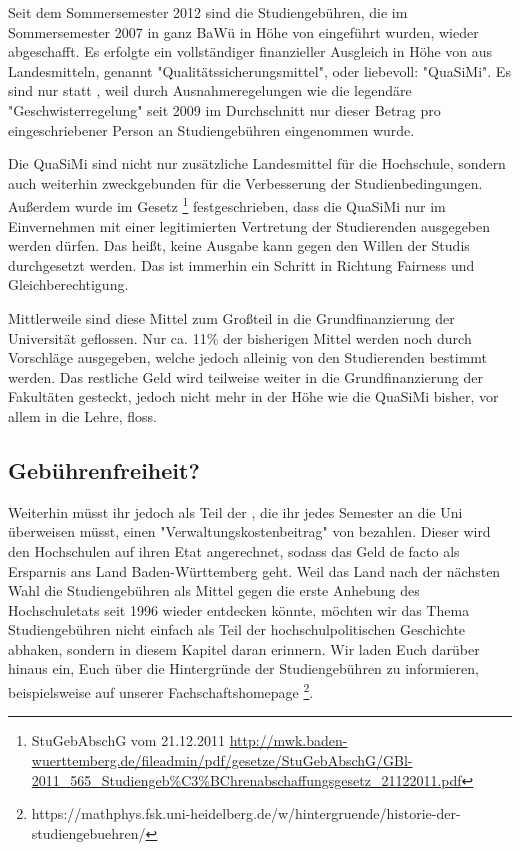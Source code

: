 %

\newpage
{}%
Seit dem Sommersemester 2012 sind die Studiengebühren, die im Sommersemester
2007 in ganz BaWü in Höhe von  eingeführt wurden, wieder abgeschafft.
Es erfolgte ein vollständiger finanzieller Ausgleich in Höhe von  aus
Landesmitteln, genannt "Qualitätssicherungsmittel", oder liebevoll: "QuaSiMi".
Es sind nur  statt , weil durch Ausnahmeregelungen wie die
legendäre "Geschwisterregelung" seit 2009 im Durchschnitt nur dieser Betrag pro
eingeschriebener Person an Studiengebühren eingenommen wurde.

Die QuaSiMi sind nicht nur zusätzliche Landesmittel für die Hochschule, sondern
auch weiterhin zweckgebunden für die Verbesserung der Studienbedingungen.
Außerdem wurde im Gesetz \footnote{StuGebAbschG vom 21.12.2011
\url{http://mwk.baden-wuerttemberg.de/fileadmin/pdf/gesetze/StuGebAbschG/GBl-2011_565_Studiengeb\%C3\%BChrenabschaffungsgesetz_21122011.pdf}}
festgeschrieben, dass die QuaSiMi nur im Einvernehmen mit einer legitimierten
Vertretung der Studierenden ausgegeben werden dürfen. Das heißt, keine Ausgabe
kann gegen den Willen der Studis durchgesetzt werden. Das ist immerhin ein
Schritt in Richtung Fairness und Gleichberechtigung.

Mittlerweile sind diese Mittel zum Großteil in die Grundfinanzierung der
Universität geflossen. Nur ca. 11\% der bisherigen Mittel werden noch durch
Vorschläge ausgegeben, welche jedoch alleinig von den Studierenden bestimmt
werden. Das restliche Geld wird teilweise weiter in die Grundfinanzierung der
Fakultäten gesteckt, jedoch nicht mehr in der Höhe wie die QuaSiMi bisher,
vor allem in die Lehre, floss.

\subsection*{Gebührenfreiheit?}
Weiterhin müsst ihr jedoch als Teil der \EUR{\beitragssumme}, die ihr jedes
Semester an die Uni überweisen müsst, einen "Verwaltungskostenbeitrag" von
\EUR{\verwaltungsbetrag} bezahlen. Dieser wird den Hochschulen auf ihren Etat
angerechnet, sodass das Geld de facto als Ersparnis ans Land Baden-Württemberg
geht. Weil das Land nach der nächsten Wahl die Studiengebühren als Mittel gegen
die erste Anhebung des Hochschuletats seit 1996 wieder entdecken könnte, möchten
wir das Thema Studiengebühren nicht einfach als Teil der hochschulpolitischen
Geschichte abhaken, sondern in diesem Kapitel daran erinnern.
Wir laden Euch darüber hinaus ein, Euch über die Hintergründe der
Studiengebühren zu informieren, beispielsweise auf unserer Fachschaftshomepage
\footnote{https://mathphys.fsk.uni-heidelberg.de/w/hintergruende/historie-der-studiengebuehren/}.

